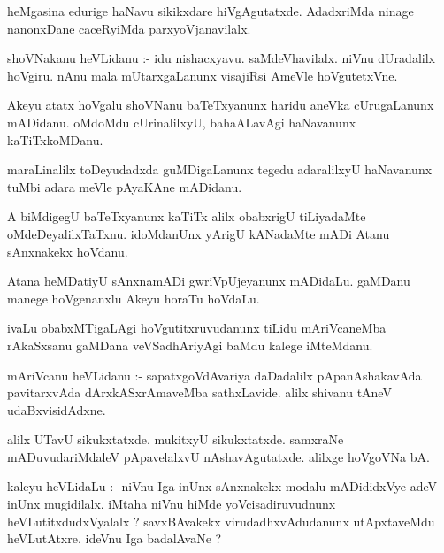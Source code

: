 \documentclass{article}
\begin{document}
\begin{mn}
heMgasina  edurige  haNavu  sikikxdare  hiVgAgutatxde.  AdadxriMda  ninage  nanonxDane  caceRyiMda  parxyoVjanavilalx.
\end{mn}

\begin{mn}
shoVNakanu  heVLidanu :- idu  nishacxyavu.  saMdeVhavilalx.  niVnu  dUradalilx  hoVgiru.  nAnu  mala  
mUtarxgaLanunx  visajiRsi  AmeVle  hoVgutetxVne.
\end{mn}

\begin{mn}
Akeyu  atatx hoVgalu  shoVNanu  baTeTxyanunx  haridu  aneVka  cUrugaLanunx  mADidanu.  oMdoMdu  cUrinalilxyU,  
bahaALavAgi  haNavanunx  kaTiTxkoMDanu.
\end{mn}

\begin{mn}
maraLinalilx  toDeyudadxda  guMDigaLanunx  tegedu  adaralilxyU  haNavanunx  tuMbi  adara  meVle  pAyaKAne  mADidanu.
\end{mn}

\begin{mn}
A  biMdigegU  baTeTxyanunx  kaTiTx  alilx  obabxrigU  tiLiyadaMte  oMdeDeyalilxTaTxnu.  idoMdanUnx  
yArigU  kANadaMte  mADi  Atanu  sAnxnakekx  hoVdanu.
\end{mn}

\begin{mn}
Atana  heMDatiyU  sAnxnamADi  gwriVpUjeyanunx  mADidaLu.  gaMDanu  manege  hoVgenanxlu  Akeyu  horaTu hoVdaLu.
\end{mn}

\begin{mn}
ivaLu  obabxMTigaLAgi  hoVgutitxruvudanunx  tiLidu  mAriVcaneMba  rAkaSxsanu  gaMDana  veVSadhAriyAgi  
baMdu  kalege  iMteMdanu.
\end{mn}

\begin{mn}
mAriVcanu  heVLidanu :- sapatxgoVdAvariya  daDadalilx  pApanAshakavAda  pavitarxvAda  dArxkASxrAmaveMba  
sathxLavide.  alilx  shivanu  tAneV  udaBxvisidAdxne.
\end{mn}

\begin{mn}
alilx  UTavU  sikukxtatxde.  mukitxyU  sikukxtatxde.  samxraNe  mADuvudariMdaleV  pApavelalxvU  
nAshavAgutatxde.  alilxge  hoVgoVNa  bA.
\end{mn}

\begin{mn}
kaleyu  heVLidaLu :- niVnu  Iga  inUnx  sAnxnakekx  modalu  mADididxVye  adeV  inUnx  mugidilalx.  
iMtaha  niVnu  hiMde  yoVcisadiruvudnunx  heVLutitxdudxVyalalx ?  savxBAvakekx  virudadhxvAdudanunx  
utApxtaveMdu  heVLutAtxre.  ideVnu  Iga  badalAvaNe ?
\end{mn}
\end{document}
